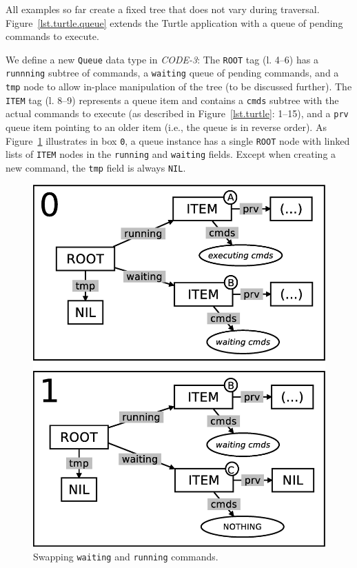 \documentclass{sig-alternate}
\newcommand{\code}[1] {{\small{\texttt{#1}}}}
\begin{document}
All examples so far create a fixed tree that does not vary during traversal.
%
Figure~\ref{lst.turtle.queue} extends the Turtle application with a queue of 
pending commands to execute.

We define a new \code{Queue} data type in \emph{CODE-3}:
The \code{ROOT} tag (l. 4--6) has a \code{runnning} subtree of commands, a 
\code{waiting} queue of pending commands, and a \code{tmp} node to allow 
in-place manipulation of the tree (to be discussed further).
%
The \code{ITEM} tag (l. 8--9) represents a queue item and contains a 
\code{cmds} subtree with the actual commands to execute (as described in 
Figure~\ref{lst.turtle}: 1--15), and a \code{prv} queue item pointing to an 
older item (i.e., the queue is in reverse order).
%
As Figure~\ref{fig.queue-1} illustrates in box \code{0}, a queue instance has a 
single \code{ROOT} node with linked lists of \code{ITEM} nodes in the 
\code{running} and \code{waiting} fields.
Except when creating a new command, the \code{tmp} field is always \code{NIL}.

\begin{figure}[t]
\centering
\includegraphics[scale=0.24]{queue-fig-1.eps}
\caption{
Swapping \code{waiting} and \code{running} commands.
\label{fig.queue-1}
}
\end{figure}
\end{document}
